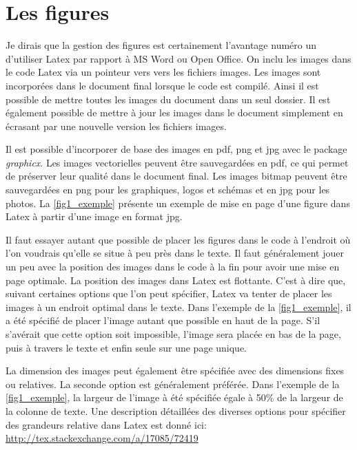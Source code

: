 \documentclass[exemple_master.tex]{subfiles}
\begin{document}
\section{Les figures}

Je dirais que la gestion des figures est certainement l'avantage numéro un d'utiliser Latex par rapport à MS Word ou Open Office. On inclu les images dans le code Latex via un pointeur vers vers les fichiers images. Les images sont incorporées dans le document final lorsque le code est compilé. Ainsi il est possible de mettre toutes les images du document dans un seul dossier. Il est également possible de mettre à jour les images dans le document simplement en écrasant par une nouvelle version les fichiers images.

Il est possible d'incorporer de base des images en pdf, png et jpg avec le package \emph{graphicx}. Les images vectorielles peuvent être sauvegardées en pdf, ce qui permet de préserver leur qualité dans le document final. Les images bitmap peuvent être sauvegardées en png pour les graphiques, logos et schémas et en jpg pour les photos. La \cref{fig1_exemple} présente un exemple de mise en page d'une figure dans Latex à partir d'une image en format jpg.

Il faut essayer autant que possible de placer les figures dans le code à l'endroit où l'on voudrais qu'elle se situe à peu près dans le texte. Il faut généralement jouer un peu avec la position des images dans le code à la fin pour avoir une mise en page optimale. La position des images dans Latex est flottante. C'est à dire que, suivant certaines options que l'on peut spécifier, Latex va tenter de placer les images à un endroit optimal dans le texte. Dans l'exemple de la \cref{fig1_exemple}, il a été spécifié de placer l'image autant que possible en haut de la page. S'il s'avérait que cette option soit impossible, l'image sera placée en bas de la page, puis à travers le texte et enfin seule sur une page unique.

La dimension des images peut également être spécifiée avec des dimensions fixes ou relatives. La seconde option est généralement préférée. Dans l'exemple de la \cref{fig1_exemple}, la largeur de l'image à été spécifiée égale à 50\% de la largeur de la colonne de texte. Une description détaillées des diverses options pour spécifier des grandeurs relative dans Latex est donné ici: \url{http://tex.stackexchange.com/a/17085/72419}

\end{document}

